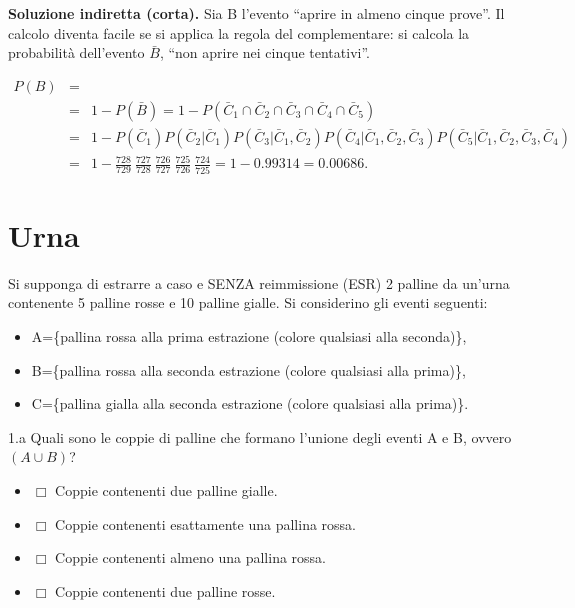 \documentclass[
  11pt,
]{book}
\providecommand{\tightlist}{%
  \setlength{\itemsep}{0pt}\setlength{\parskip}{0pt}}
\theoremstyle{mytheoremstyle}
\theoremstyle{mydefstyle}
\newenvironment{sol}
  {
  \begin{tcolorbox}[enhanced,breakable,arc=0.1mm,boxrule=1pt,colback=white,colframe=iblue,
  title=\bf \fontfamily{lmss}\selectfont \hspace{.5 cm} Soluzione,drop fuzzy shadow]

}{
\end{tcolorbox}
  }
\begin{document}
\begin{sol}
\textbf{Soluzione indiretta (corta).}
Sia B l'evento ``aprire in almeno cinque prove''.
Il calcolo diventa facile se si applica la regola del complementare:
si calcola la probabilità dell'evento \(\bar{B}\), ``non aprire nei
cinque tentativi''.

\begin{eqnarray*}
 P(B) &=& \\
&=& 1 - P(\bar{B})
 =  1 - P(\bar{C}_{1} \cap \bar{C}_{2} \cap \bar{C}_{3} \cap
          \bar{C}_{4} \cap \bar{C}_{5}) \\
&=& 1 - P(\bar{C}_{1}) P(\bar{C}_{2}  |  \bar{C}_{1})  
        P(\bar{C}_{3}  |  \bar{C}_{1}, \bar{C}_{2})  
        P(\bar{C}_{4}  |  \bar{C}_{1}, \bar{C}_{2}, \bar{C}_{3})  
        P(\bar{C}_{5}  |  \bar{C}_{1}, \bar{C}_{2}, \bar{C}_{3}, \bar{C}_{4}) \\
&=& 1 - \frac{728} {729}\ \frac{727} {728}\ \frac{726} {727}\ \frac{725} {726}\ \frac{724} {725}
 =  1 - 0.99314 = 0.00686  .
\end{eqnarray*}

\end{sol}

\section{Urna}\label{urna}

Si supponga di estrarre a caso e SENZA reimmissione (ESR) 2 palline
da un'urna contenente 5 palline rosse e 10 palline gialle.
Si considerino gli eventi seguenti:

\begin{itemize}
\tightlist
\item
  A=\{pallina rossa alla prima estrazione (colore qualsiasi alla seconda)\},
\item
  B=\{pallina rossa alla seconda estrazione (colore qualsiasi alla prima)\},
\item
  C=\{pallina gialla alla seconda estrazione (colore qualsiasi alla prima)\}.
\end{itemize}

1.a Quali sono le coppie di palline che formano l'unione
degli eventi A e B, ovvero \((A \cup B)\)?

\begin{itemize}
\tightlist
\item
  \(\Box\) Coppie contenenti due palline gialle.
\item
  \(\Box\) Coppie contenenti esattamente una pallina rossa.
\item
  \(\Box\) Coppie contenenti almeno una pallina rossa.
\item
  \(\Box\) Coppie contenenti due palline rosse.
\end{itemize}
\end{document}

